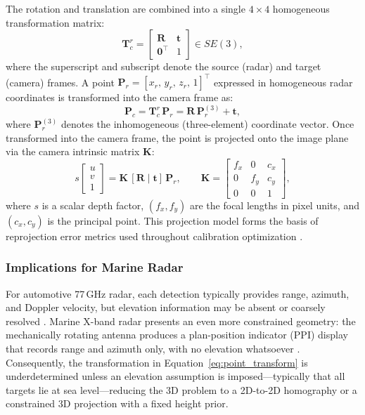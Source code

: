 The rotation and translation are combined into a single $4\times4$ homogeneous transformation matrix:
\begin{equation}\label{eq:homogeneous}
  \mathbf{T}_{c}^{r} =
  \begin{bmatrix}
    \mathbf{R} & \mathbf{t} \\
    \mathbf{0}^{\top} & 1
  \end{bmatrix}
  \in SE(3),
\end{equation}
where the superscript and subscript denote the source (radar) and target (camera) frames. A point $\mathbf{P}_{r} = [x_r,\, y_r,\, z_r,\, 1]^{\top}$ expressed in homogeneous radar coordinates is transformed into the camera frame as:
\begin{equation}\label{eq:point_transform}
  \mathbf{P}_{c} = \mathbf{T}_{c}^{r}\,\mathbf{P}_{r} = \mathbf{R}\,\mathbf{P}_{r}^{(3)} + \mathbf{t},
\end{equation}
where $\mathbf{P}_{r}^{(3)}$ denotes the inhomogeneous (three-element) coordinate vector. Once transformed into the camera frame, the point is projected onto the image plane via the camera intrinsic matrix $\mathbf{K}$:
\begin{equation}\label{eq:projection}
  s\begin{bmatrix}u\\v\\1\end{bmatrix}
  = \mathbf{K}\,[\mathbf{R} \mid \mathbf{t}]\,\mathbf{P}_{r},
  \qquad
  \mathbf{K} = \begin{bmatrix}f_x & 0 & c_x \\ 0 & f_y & c_y \\ 0 & 0 & 1\end{bmatrix},
\end{equation}
where $s$ is a scalar depth factor, $(f_x, f_y)$ are the focal lengths in pixel units, and $(c_x, c_y)$ is the principal point. This projection model forms the basis of reprojection error metrics used throughout calibration optimization \cite{zhang2000flexible}.

\subsubsection{Implications for Marine Radar}

For automotive 77\,GHz radar, each detection typically provides range, azimuth, and Doppler velocity, but elevation information may be absent or coarsely resolved \cite{patole20174d}. Marine X-band radar presents an even more constrained geometry: the mechanically rotating antenna produces a plan-position indicator (PPI) display that records range and azimuth only, with no elevation whatsoever \cite{Skolnik2008}. Consequently, the transformation in Equation~\eqref{eq:point_transform} is underdetermined unless an elevation assumption is imposed---typically that all targets lie at sea level---reducing the 3D problem to a 2D-to-2D homography or a constrained 3D projection with a fixed height prior.

